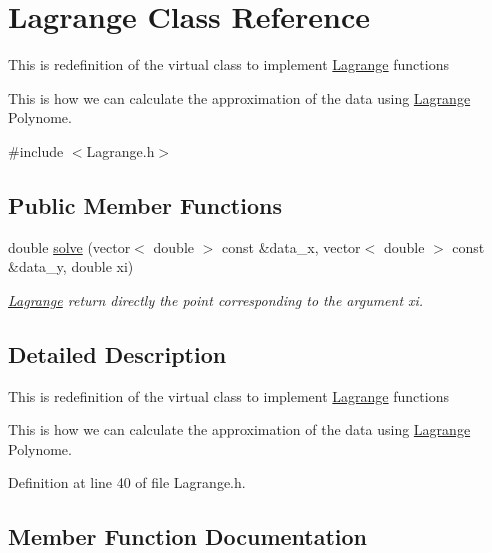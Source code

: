 \hypertarget{class_lagrange}{}\section{Lagrange Class Reference}
\label{class_lagrange}


This is redefinition of the virtual class to implement \mbox{\hyperlink{class_lagrange}{Lagrange}} functions

This is how we can calculate the approximation of the data using \mbox{\hyperlink{class_lagrange}{Lagrange}} Polynome.  




{\ttfamily \#include $<$Lagrange.\+h$>$}

\subsection*{Public Member Functions}
\begin{DoxyCompactItemize}
\item 
double \mbox{\hyperlink{class_lagrange_a9040a01112a83bbefb0f1bef1d7983bb}{solve}} (vector$<$ double $>$ const \&data\+\_\+x, vector$<$ double $>$ const \&data\+\_\+y, double xi)
\begin{DoxyCompactList}\small\item\em \mbox{\hyperlink{class_lagrange}{Lagrange}} return directly the point corresponding to the argument xi. \end{DoxyCompactList}\end{DoxyCompactItemize}


\subsection{Detailed Description}
This is redefinition of the virtual class to implement \mbox{\hyperlink{class_lagrange}{Lagrange}} functions

This is how we can calculate the approximation of the data using \mbox{\hyperlink{class_lagrange}{Lagrange}} Polynome. 

Definition at line 40 of file Lagrange.\+h.



\subsection{Member Function Documentation}
\mbox{\label{class_lagrange_a9040a01112a83bbefb0f1bef1d7983bb}} 
